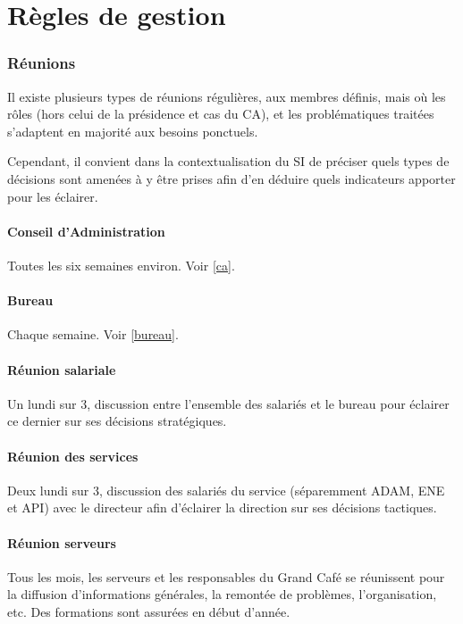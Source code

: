 \section{Règles de gestion}
\label{gestion}

\subsubsection{Réunions}

Il existe plusieurs types de réunions régulières, aux membres définis,
mais où les rôles (hors celui de la présidence et cas du CA),
et les problématiques traitées s'adaptent en majorité aux besoins ponctuels.

Cependant, il convient dans la contextualisation du SI de préciser quels types
de décisions sont amenées à y être prises afin d'en déduire quels
indicateurs apporter pour les éclairer.

\paragraph{Conseil d'Administration} Toutes les six semaines environ.
Voir \ref{ca}.

\paragraph{Bureau} Chaque semaine. Voir \ref{bureau}.

\paragraph{Réunion salariale} Un lundi sur 3, discussion entre l'ensemble
des salariés et le bureau pour éclairer ce dernier sur ses
décisions stratégiques.

\paragraph{Réunion des services} Deux lundi sur 3, discussion des
salariés du service (séparemment ADAM, ENE et API) avec le directeur
afin d'éclairer la direction sur ses décisions tactiques.

\paragraph{Réunion serveurs} Tous les mois, les serveurs et les responsables
du Grand Café se réunissent pour la diffusion d'informations générales,
la remontée de problèmes, l'organisation, etc. Des formations sont
assurées en début d'année.

